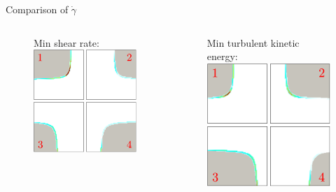 \documentclass[aspectratio=169,xcolor=dvipsnames]{beamer}
\begin{document}
\begin{frame}{Comparison of $ \dot{\gamma} $}
	\addtocounter{framenumber}{-1}
	\begin{columns}
		\begin{column}{.42\textwidth}
			\begin{figure}
				\vspace{-1mm}
				Min shear rate:
				\includegraphics[width=0.8\linewidth, trim={0 0 0cm 0mm}, clip]{Images/gamma_frame.pdf}		
			\end{figure}
		\end{column}
		\begin{column}{.42\textwidth}
			\begin{figure}
				\vspace{-1mm}
				Min turbulent kinetic energy:
				\includegraphics[width=0.8\linewidth, trim={0 0 0 0mm}, clip]{Images/tke_frame.pdf}		

\end{figure}
\end{column}
\end{columns}
\end{frame}
\end{document}
